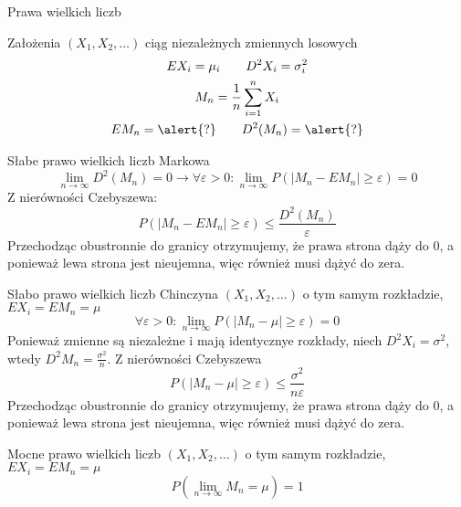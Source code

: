 \documentclass{mp}
\begin{document}
\begin{frame}{Prawa wielkich liczb}
\begin{block}{Założenia}
$(X_1,X_2,\ldots)$ ciąg niezależnych zmiennych losowych\\
\begin{gather*}
EX_i=\mu_i \qquad D^2X_i=\sigma_i^2 \\
M_n=\frac{1}{n}\sum_{i=1}^n X_i \\
EM_n=\alert{?} \qquad D^2(M_n)=\alert{?}
\end{gather*}
\note{\[EM_n=\frac{1}{n}\sum_{i=1}^n \mu_i \qquad D^2(M_n)=\frac{1}{n^2}\sum_{i=1}^n\sigma_i^2\]}
\end{block}
{
\begin{block}{Słabe prawo wielkich liczb Markowa}
\[ \lim_{n\to\infty} D^2(M_n)=0 \to \forall \varepsilon>0\colon \lim_{n\to\infty} P(\left|M_n-EM_n\right|\geq\varepsilon)=0 \]
\note
{
	Z nierówności Czebyszewa:
	\[P(\left|M_n-EM_n\right|\geq\varepsilon)\leq \frac{D^2(M_n)}{\varepsilon}\]
	Przechodząc obustronnie do granicy otrzymujemy, że prawa strona dąży do 0, a ponieważ lewa strona jest nieujemna, więc również musi dążyć do zera.
}
\end{block}
}
{
\begin{block}{Słabo prawo wielkich liczb Chinczyna}
$(X_1,X_2,\ldots)$ o tym samym rozkładzie, $EX_i=EM_n=\mu$
\[ \forall \varepsilon>0\colon \lim_{n\to\infty} P(\left|M_n-\mu\right|\geq\varepsilon)=0 \]
\note
{
	Ponieważ zmienne są niezależne i mają identycznye rozkłady, niech $D^2X_i=\sigma^2$, wtedy $D^2M_n=\frac{\sigma^2}{n}$. Z nierówności Czebyszewa
	\[P(\left|M_n-\mu\right|\geq\varepsilon)\leq \frac{\sigma^2}{n\varepsilon} \]
	Przechodząc obustronnie do granicy otrzymujemy, że prawa strona dąży do 0, a ponieważ lewa strona jest nieujemna, więc również musi dążyć do zera.
}
\end{block}
}
{
\begin{block}{Mocne prawo wielkich liczb}
$(X_1,X_2,\ldots)$ o tym samym rozkładzie, $EX_i=EM_n=\mu$
\[P(\lim_{n\to\infty} M_n=\mu)=1\]
\end{block}
}
\end{frame}
\end{document}
